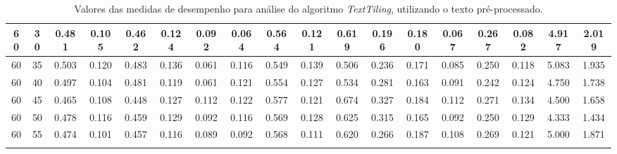 \begin{longtable}[c]{|c|c|c|c|c|c|c|c|c|c|c|c|c|c|c|c|c|c|}
  60 & 30 & 0.481 & 0.105 & 0.462 & 0.124 & 0.092 & 0.064 & 0.564 & 0.121 & 0.619 & 0.196 & 0.180 & 0.067 & 0.267 & 0.082 & 4.917 & 2.019  \\ \hline 
  60 & 35 & 0.503 & 0.120 & 0.483 & 0.136 & 0.061 & 0.116 & 0.549 & 0.139 & 0.506 & 0.236 & 0.171 & 0.085 & 0.250 & 0.118 & 5.083 & 1.935  \\ \hline 
  60 & 40 & 0.497 & 0.104 & 0.481 & 0.119 & 0.061 & 0.121 & 0.554 & 0.127 & 0.534 & 0.281 & 0.163 & 0.091 & 0.242 & 0.124 & 4.750 & 1.738  \\ \hline 
  60 & 45 & 0.465 & 0.108 & 0.448 & 0.127 & 0.112 & 0.122 & 0.577 & 0.121 & 0.674 & 0.327 & 0.184 & 0.112 & 0.271 & 0.134 & 4.500 & 1.658  \\ \hline 
  60 & 50 & 0.478 & 0.116 & 0.459 & 0.129 & 0.092 & 0.116 & 0.569 & 0.128 & 0.625 & 0.315 & 0.165 & 0.092 & 0.250 & 0.129 & 4.333 & 1.434  \\ \hline 
  60 & 55 & 0.474 & 0.101 & 0.457 & 0.116 & 0.089 & 0.092 & 0.568 & 0.111 & 0.620 & 0.266 & 0.187 & 0.108 & 0.269 & 0.121 & 5.000 & 1.871  \\ \hline 
 \caption{Valores das medidas de desempenho para análise do algoritmo \textit{TextTiling}, utilizando o texto pré-processado.}
 \end{longtable} 

